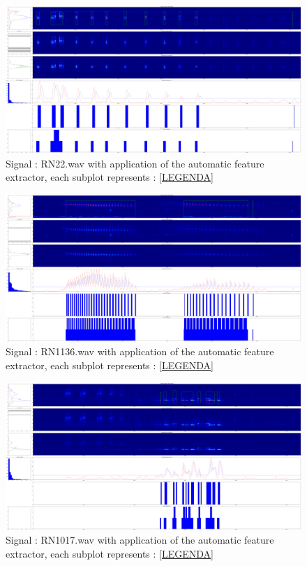 \documentclass[a4paper]{report}
\begin{document}
\begin{figure}[H]
\begin{center}
\includegraphics[scale=0.07]{3test.png}\caption{Signal : RN22.wav with application of the automatic feature extractor, each subplot represents : \ref{LEGENDA} }
\end{center}
\end{figure}


\begin{figure}[H]
\begin{center}
\includegraphics[scale=0.07]{4test.png}\caption{Signal : RN1136.wav with application of the automatic feature extractor, each subplot represents : \ref{LEGENDA} }
\end{center}
\end{figure}


\begin{figure}[H]
\begin{center}
\includegraphics[scale=0.07]{6test.png}\caption{Signal : RN1017.wav with application of the automatic feature extractor, each subplot represents : \ref{LEGENDA} }
\end{center}
\end{figure}
\end{document}
